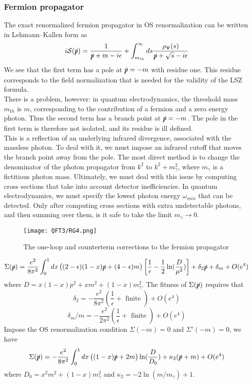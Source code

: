\documentclass[cyan]{elegantnote}
\begin{document}
\subsubsection{Fermion propagator}
The exact renormalized fermion propagator in OS renormalization can be written in Lehmann–Kallen form as
\[i\mathcal{S}(\slashed{p}) = \frac{1}{\slashed{p}+m-i\epsilon} + \int_{m_{th}}^{\infty} ds \frac{\rho_{\Psi}(s)}{\slashed{p}+\sqrt{s}-i\epsilon}\]
We see that the first term has a pole at $\slashed{p}=-m$ with residue one. This residue corresponds to the field normalization that is needed for the validity of the LSZ formula.
\\
There is a problem, however: in quantum electrodynamics, the threshold mass $m_{th}$ is $m$, corresponding to the contribution of a fermion and a zero energy photon. Thus the second term has a branch point at $\slashed{p}=-m$. The pole in the first term is therefore not isolated, and its residue is ill defined.
\\
This is a reflection of an underlying infrared divergence, associated with the massless photon. To deal with it, we must impose an infrared cutoff that moves the branch point away from the pole. The most direct method is to change the denominator of the photon propagator from $k^2$ to $k^2+m_{\gamma}^2$, where $m_{\gamma}$ is a fictitious photon mass. Ultimately, we must deal with this issue by computing cross sections that take into account detector inefficiencies. In quantum electrodynamics, we must specify the
lowest photon energy $\omega_{min}$ that can be detected. Only after computing cross sections with extra undetectable photons, and then summing over them, is it safe to take the limit $m_{\gamma} \to 0$. 
\begin{figure}[!h]
\centering
\texttt{[image: QFT3/RG4.png]}
\caption{The one-loop and counterterm corrections to the fermion propagator}
\end{figure}
\[\Sigma(\slashed{p}) = \frac{e^2}{8\pi^2} \int_0^1 dx \left( (2-\epsilon)(1-x)\slashed{p} + (4-\epsilon)m \right) \left[ \frac{1}{\epsilon} - \frac{1}{2}\ln(\frac{D}{\mu^2})\right] + \delta_2 \slashed{p} + \delta_m + O(e^4) \]
where $D = x(1-x)p^2 + xm^2 + (1-x)m_{\gamma}^2$.
The fitness of $\Sigma(\slashed{p})$ requires that
\[\delta_2 =  - \frac{e^2}{8\pi^2} \left( \frac{1}{\epsilon} + \mbox{ finite } \right) + O(e^4)\]
\[\delta_m/m = - \frac{e^2}{2\pi^2} \left( \frac{1}{\epsilon} + \mbox{ finite } \right) + O(e^4) \]
Impose the OS renormalization condition $\Sigma(-m) = 0$ and $\Sigma'(-m) = 0$, we have
\[\Sigma(\slashed{p}) = -\frac{e^2}{8\pi^2} \int_0^1 dx \left( (1-x)\slashed{p} + 2m \right) \ln(\frac{D}{D_0})  + \kappa_2( \slashed{p} + m) + O(e^4) \]
where $D_0 = x^2m^2 +(1-x)m_{\gamma}^2$ and $\kappa_2 = -2 \ln(m/m_{\gamma})+1$. 
\end{document}

